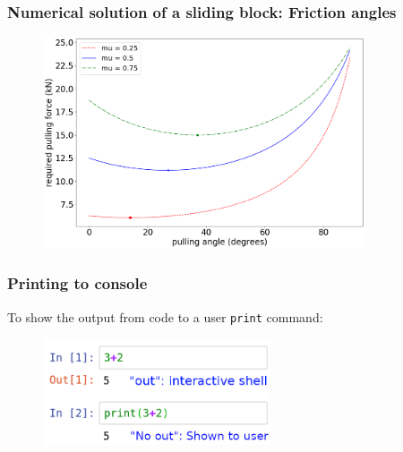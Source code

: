 \documentclass[notes]{beamer}
\begin{document}
\begin{frame}
	\frametitle{Numerical solution of a sliding block: Friction angles}	
	\begin{figure}[ht]
		\centering
		\includegraphics[width=0.85\textwidth]{figs/sliding-block-force-frictions.png}
	\end{figure}
\end{frame}


\begin{frame}[fragile]
	\frametitle{Printing to console}
	To show the output from code to a user \verb|print| command:
	\begin{figure}[ht]
		\centering
		\includegraphics[width=0.6\textwidth]{figs/shell-print.png}
	\end{figure}
\end{frame}
\end{document}
